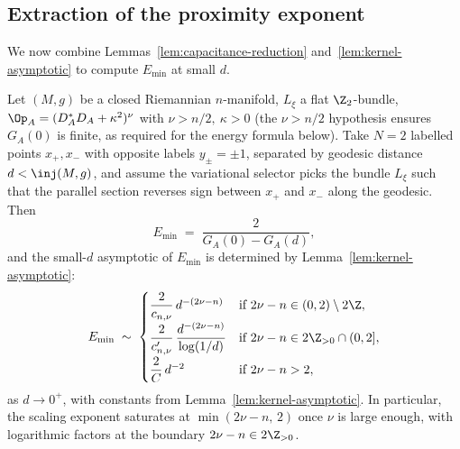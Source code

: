 \subsection{Extraction of the proximity exponent}
\label{ssec:proximity-exponent}

We now combine Lemmas~\ref{lem:capacitance-reduction}
and~\ref{lem:kernel-asymptotic} to compute $E_{\min}$ at small $d$.

\begin{theorem}
\label{thm:proximity-scaling-2pt}
Let $(M,g)$ be a closed Riemannian $n$-manifold, $L_\xi$ a flat
$\Z_2$-bundle, $\Op_A=(D_A^*D_A+\kappa^2)^\nu$ with $\nu>n/2,\
\kappa>0$ (the $\nu>n/2$ hypothesis ensures $G_A(0)$ is finite, as
required for the energy formula below). Take $N=2$ labelled points
$x_+,x_-$ with opposite labels $y_\pm=\pm 1$, separated by geodesic
distance $d<\inj(M,g)$, and assume the variational selector picks
the bundle $L_\xi$ such that the parallel section reverses sign
between $x_+$ and $x_-$ along the geodesic. Then
\[
   E_{\min} \;=\; \frac{2}{G_A(0)-G_A(d)},
\]
and the small-$d$ asymptotic of $E_{\min}$ is determined by
Lemma~\ref{lem:kernel-asymptotic}:
\[
   E_{\min} \;\sim\;
   \begin{cases}
      \dfrac{2}{c_{n,\nu}}\,d^{-(2\nu-n)}
      & \text{if } 2\nu-n\in(0,2)\setminus 2\Z, \\[6pt]
      \dfrac{2}{c_{n,\nu}'}\,\dfrac{d^{-(2\nu-n)}}{\log(1/d)}
      & \text{if } 2\nu-n\in 2\Z_{>0}\cap(0,2], \\[8pt]
      \dfrac{2}{C}\,d^{-2}
      & \text{if } 2\nu-n>2,
   \end{cases}
\]
as $d\to 0^+$, with constants from
Lemma~\ref{lem:kernel-asymptotic}. In particular, the scaling
exponent saturates at $\min(2\nu-n,\,2)$ once $\nu$ is large enough,
with logarithmic factors at the boundary $2\nu-n\in 2\Z_{>0}$.
\end{theorem}

